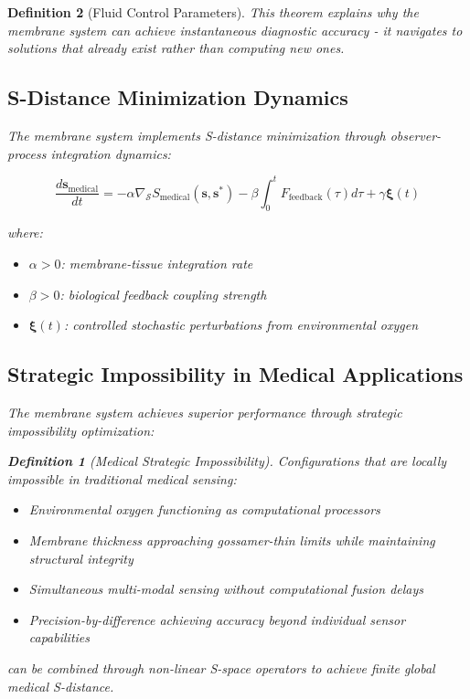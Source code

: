 \documentclass[12pt,a4paper]{article}
\newtheorem{definition}{Definition}
\begin{document}
\begin{definition}[Fluid Control Parameters]
This theorem explains why the membrane system can achieve instantaneous diagnostic accuracy - it navigates to solutions that already exist rather than computing new ones.

\subsection{S-Distance Minimization Dynamics}

The membrane system implements S-distance minimization through observer-process integration dynamics:

\begin{equation}
\frac{d\mathbf{s}_{\text{medical}}}{dt} = -\alpha \nabla_{\mathcal{S}} S_{\text{medical}}(\mathbf{s}, \mathbf{s}^*) - \beta \int_0^t F_{\text{feedback}}(\tau) d\tau + \gamma \mathbf{\xi}(t)
\end{equation}

where:
\begin{itemize}
\item $\alpha > 0$: membrane-tissue integration rate
\item $\beta > 0$: biological feedback coupling strength  
\item $\mathbf{\xi}(t)$: controlled stochastic perturbations from environmental oxygen
\end{itemize}

\subsection{Strategic Impossibility in Medical Applications}

The membrane system achieves superior performance through strategic impossibility optimization:

\begin{definition}[Medical Strategic Impossibility]
Configurations that are locally impossible in traditional medical sensing:
\begin{itemize}
\item Environmental oxygen functioning as computational processors
\item Membrane thickness approaching gossamer-thin limits while maintaining structural integrity
\item Simultaneous multi-modal sensing without computational fusion delays
\item Precision-by-difference achieving accuracy beyond individual sensor capabilities
\end{itemize}
can be combined through non-linear S-space operators to achieve finite global medical S-distance.
\end{definition}


\end{definition}
\end{document}
